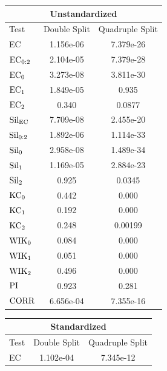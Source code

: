 \documentclass[12pt]{article}
\begin{document}
\begin{table}[htp!]
    \begin{center}
        \begin{tabular}{ l | c | c }
          \toprule
          \multicolumn{3}{c}{Unstandardized} \\
          \toprule
          Test & Double Split & Quadruple Split \\
          \midrule
          EC & 1.156e-06 & 7.379e-26 \\
          $\textup{EC}_{0:2}$ & 2.104e-05 & 7.379e-28 \\
          $\textup{EC}_{0}$ & 3.273e-08 & 3.811e-30 \\
          $\textup{EC}_{1}$ &  1.849e-05 & 0.935 \\
          $\textup{EC}_{2}$ & 0.340 & 0.0877 \\
          \midrule
          $\textup{Sil}_{\textup{EC}}$ & 7.709e-08 & 2.455e-20 \\
          $\textup{Sil}_{0:2}$ & 1.892e-06 & 1.114e-33 \\
          $\textup{Sil}_{0}$ & 2.958e-08 & 1.489e-34 \\
          $\textup{Sil}_{1}$ & 1.169e-05 & 2.884e-23 \\
          $\textup{Sil}_{2}$ & 0.925 & 0.0345 \\
          \midrule
          $\textup{KC}_{0}$ & 0.442 & 0.000 \\
          $\textup{KC}_{1}$ & 0.192 & 0.000 \\
          $\textup{KC}_{2}$ & 0.248 & 0.00199 \\
          \midrule
          $\textup{WIK}_{0}$ & 0.084 & 0.000 \\
          $\textup{WIK}_{1}$ & 0.051 & 0.000 \\
          $\textup{WIK}_{2}$ & 0.496 & 0.000 \\
          $\textup{PI}$ & 0.923 & 0.281 \\
          \midrule
          $\textup{CORR}$ & 6.656e-04 & 7.355e-16 \\
          \bottomrule
        \end{tabular}
        \begin{tabular}{ l | c |  c }
          \toprule
          \multicolumn{3}{c}{Standardized} \\
          \toprule
          Test & Double Split & Quadruple Split \\
          \midrule
          EC & 1.102e-04 &  7.345e-12 \\

\end{tabular}
\end{center}
\end{table}
\end{document}
